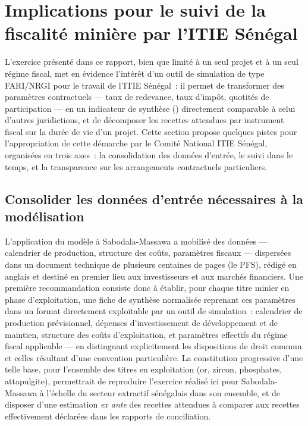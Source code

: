 \chapter{Implications pour le suivi de la fiscalité minière par l'ITIE Sénégal}
\label{chap:recommandations}

L'exercice présenté dans ce rapport, bien que limité à un seul projet et à un seul régime fiscal, met en évidence l'intérêt d'un outil de simulation de type FARI/NRGI pour le travail de l'ITIE Sénégal~: il permet de transformer des paramètres contractuels --- taux de redevance, taux d'impôt, quotités de participation --- en un indicateur de synthèse (\TEMI) directement comparable à celui d'autres juridictions, et de décomposer les recettes attendues par instrument fiscal sur la durée de vie d'un projet. Cette section propose quelques pistes pour l'appropriation de cette démarche par le Comité National ITIE Sénégal, organisées en trois axes~: la consolidation des données d'entrée, le suivi dans le temps, et la transparence sur les arrangements contractuels particuliers.

\section{Consolider les données d'entrée nécessaires à la modélisation}

L'application du modèle à Sabodala-Massawa a mobilisé des données --- calendrier de production, structure des coûts, paramètres fiscaux --- dispersées dans un document technique de plusieurs centaines de pages (le PFS), rédigé en anglais et destiné en premier lieu aux investisseurs et aux marchés financiers. Une première recommandation consiste donc à établir, pour chaque titre minier en phase d'exploitation, une fiche de synthèse normalisée reprenant ces paramètres dans un format directement exploitable par un outil de simulation~: calendrier de production prévisionnel, dépenses d'investissement de développement et de maintien, structure des coûts d'exploitation, et paramètres effectifs du régime fiscal applicable --- en distinguant explicitement les dispositions de droit commun et celles résultant d'une convention particulière. La constitution progressive d'une telle base, pour l'ensemble des titres en exploitation (or, zircon, phosphates, attapulgite), permettrait de reproduire l'exercice réalisé ici pour Sabodala-Massawa à l'échelle du secteur extractif sénégalais dans son ensemble, et de disposer d'une estimation \emph{ex ante} des recettes attendues à comparer aux recettes effectivement déclarées dans les rapports de conciliation.

